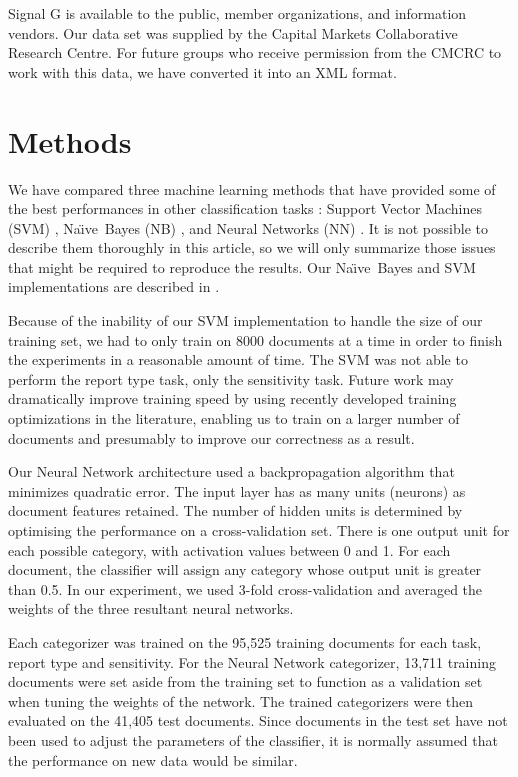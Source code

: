 \documentclass[twocolumn]{article}
\newcommand{\naive}{Na\"\i ve}
\begin{document}
Signal G is available to the public, member organizations, and
information vendors.  Our data set was supplied by the Capital Markets
Collaborative Research Centre.  For future groups who receive
permission from the CMCRC to work with this data, we have converted it
into an XML format.



\section{Methods}
\label{methods}


We have compared three machine learning methods that have provided
some of the best performances in other classification tasks
\cite{yang:99}: Support Vector Machines (SVM) \cite{scholkopf:99}
\cite{joachims:99}, \naive\ Bayes (NB) \cite{lewis:98}, and Neural
Networks (NN) \cite{calvo:00} \cite{calvo:01}. It is not possible to
describe them thoroughly in this article, so we will only summarize
those issues that might be required to reproduce the results.  Our
\naive\ Bayes and SVM implementations are described in
\cite{williams:02}.

Because of the inability of our SVM implementation to handle the size
of our training set, we had to only train on 8000 documents at a time
in order to finish the experiments in a reasonable amount of time.
The SVM was not able to perform the report type task, only the sensitivity
task.  Future work may dramatically improve training speed by using
recently developed training optimizations in the literature, enabling
us to train on a larger number of documents and presumably to improve
our correctness as a result.

Our Neural Network architecture \cite{calvo:00} \cite{calvo:01} used a
backpropagation algorithm that minimizes quadratic error. The input
layer has as many units (neurons) as document features retained. The
number of hidden units is determined by optimising the performance on
a cross-validation set. There is one output unit for each possible
category, with activation values between 0 and 1. For each document,
the classifier will assign any category whose output unit is greater
than 0.5. In our experiment, we used 3-fold cross-validation and
averaged the weights of the three resultant neural networks.

Each categorizer was trained on the 95,525 training documents for each
task, report type and sensitivity.  For the Neural Network
categorizer, 13,711 training documents were set aside from the
training set to function as a validation set when tuning the weights
of the network.  The trained categorizers were then evaluated on the
41,405 test documents. Since documents in the test set have not been
used to adjust the parameters of the classifier, it is normally
assumed that the performance on new data would be similar.
\end{document}
